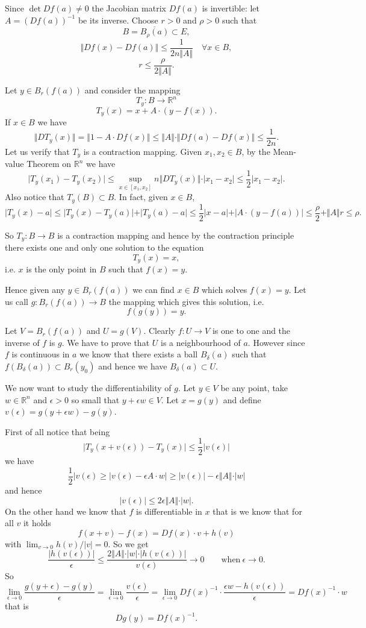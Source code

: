 \documentclass[12pt]{article}
\newcommand{\R}{\mathbb R}
\begin{document}
Since $\det Df(a)\neq 0$ the Jacobian matrix $Df(a)$ is invertible:
let $A=(Df(a))^{-1}$ be its inverse.
Choose $r>0$ and $\rho>0$ such that
\[
  B=\overline{B_\rho(a)} \subset E,
\]
\[
  \Vert Df(x) - Df(a)\Vert \le \frac{1}{2n\Vert A \Vert}\quad
\forall x \in B,
\]
\[
  r\le \frac{\rho}{2\Vert A\Vert}.
\]

Let $y\in B_r(f(a))$ and consider the mapping
\[
  T_y \colon B \to \R^n
\]
\[
  T_y(x) = x + A\cdot(y-f(x)).
\]
If $x\in B$ we have
\[
  \Vert D T_y(x)\Vert = \Vert 1- A\cdot Df(x)\Vert
  \le \Vert A\Vert \cdot \Vert Df(a) - Df(x)\Vert \le \frac{1}{2n}.
\]
Let us verify that $T_y$ is a contraction mapping. Given $x_1,x_2\in B$, by the Mean-value Theorem on $\R^n$ we have
\[
  \vert T_y(x_1) - T_y(x_2)\vert \le 
   \sup_{x\in[x_1,x_2]} n \Vert DT_y(x)\Vert \cdot
  \vert x_1 - x_2\vert \le \frac 1 2 \vert x_1 -x_2\vert.
\]
Also notice that $T_y(B)\subset B$. In fact, given $x\in B$,
\[
 \vert T_y(x)-a\vert 
\le \vert T_y(x) - T_y(a)\vert + \vert T_y(a)-a\vert
\le \frac 1 2 \vert x -a\vert + \vert A\cdot (y-f(a))\vert
\le \frac \rho 2 + \Vert A\Vert r \le \rho.
\]

So $T_y\colon B\to B$ is a contraction mapping and hence by the contraction principle there exists one and only one solution to the equation
\[
  T_y(x)=x,
\]
i.e. $x$ is the only point in $B$ such that $f(x)=y$.

Hence given any $y\in B_r(f(a))$ 
we can find $x\in B$ which solves $f(x)=y$. Let us
call $g\colon B_r(f(a))\to B$ the mapping which gives this solution, i.e. 
\[
  f(g(y))=y.
\]

Let $V=B_r(f(a))$ and $U=g(V)$. Clearly $f\colon U \to V$ is one to one and the inverse of $f$ is $g$. We have to prove that $U$ is a neighbourhood of $a$.
However since $f$ is continuous in $a$ we know that there exists a ball $B_\delta(a)$ such that $f(B_\delta(a))\subset B_r(y_0)$ and hence 
we have $B_\delta(a)\subset U$.

We now want to study the differentiability of $g$. Let $y\in V$ be any point, take $w\in \R^n$ and $\epsilon>0$ so small that $y+\epsilon w\in V$.
Let $x=g(y)$ and define $v(\epsilon)=g(y+\epsilon w)-g(y)$.

First of all notice that being
\[
 \vert T_y(x+v(\epsilon)) - T_y(x)\vert \le \frac 1 2 \vert v(\epsilon)\vert
\]
we have
\[
  \frac 1 2 \vert v(\epsilon) \ge \vert v(\epsilon)-\epsilon A\cdot w\vert
  \ge \vert v(\epsilon)\vert - \epsilon\Vert A\Vert\cdot \vert w\vert
\] 
and hence
\[
  \vert v(\epsilon)\vert \le 2\epsilon \Vert A\Vert\cdot\vert w\vert.
\]
On the other hand we know that $f$ is differentiable in $x$ that is we know that
for all $v$ it holds
\[
  f(x+v)-f(x) = Df(x)\cdot v + h(v)
\]
with $\lim_{v\to 0} h(v)/\vert v\vert = 0$. So we get
\[
  \frac{\vert h(v(\epsilon))\vert}{\epsilon}
\le \frac{2\Vert A\Vert\cdot \vert w\vert\cdot \vert h(v(\epsilon))\vert}
{v(\epsilon)} \to 0 \qquad\mathrm{when}\ \epsilon\to 0.
\]
So
\[
  \lim_{\epsilon\to 0} \frac {g(y+\epsilon)-g(y)}{\epsilon}
  =\lim_{\epsilon\to 0} \frac {v(\epsilon)}{\epsilon}
  = \lim_{\epsilon\to 0} Df(x)^{-1}\cdot \frac{\epsilon w - h(v(\epsilon))}{\epsilon}
  = Df(x)^{-1}\cdot w
\]
that is
\[
  Dg(y)=Df(x)^{-1}.
\]
\end{document}
